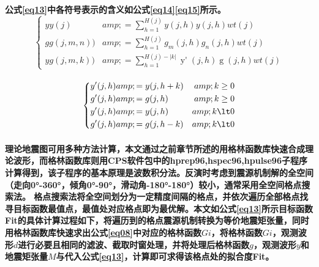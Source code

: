\documentclass[a4paper,12pt,single,pdftex]{scrartcl}
\begin{document}
\label{ID_247138940}\paragraph{公式\ref{eq13}中各符号表示的含义如公式\ref{eq14}\ref{eq15}所示。
\begin{equation}
\label{eq14}
\left\{
    \begin{aligned}
    yy(j)&amp;=\sum_{h=1}^{H(j)}y(j,h)y(j,h)wt(j)\\
    gg(j,m,n))&amp;=\sum_{h=1}^{H(j)}g_{m}(j,h)g_{n}(j,h)wt(j)\\
    yg(j,m,k))&amp;=\sum_{h=1}^{H(j)-|k|}\mathop{{y}'}(j,h)\mathop{{g}'_{m}}(j,h)wt(j)
    \end{aligned}
\right.
\end{equation}}

\label{ID_457268259}\paragraph{\begin{equation}
\label{eq15}
\left\{
    \begin{aligned}
    \mathop{{y}'}(j,h)&amp;=y(j,h+k) &amp;k\geq0 \\
    \mathop{{g}'}(j,h)&amp;=g(j,h)   &amp;k\geq0 \\
    \mathop{{y}'}(j,h)&amp;=y(j,h)   &amp;k\lt0 \\
    \mathop{{g}'}(j,h)&amp;=g(j,h-k) &amp;k\lt0 \\
    \end{aligned}   \\
\right.
\end{equation}}

\label{ID_31082694}\paragraph{}

\label{ID_1372162761}\paragraph{理论地震图可用多种方法计算，本文通过之前章节所述的用格林函数库快速合成理论波形，而格林函数库则用CPS软件包中的hprep96,hspec96,hpulse96子程序计算得到，该子程序的基本原理是波数积分法。反演时考虑到震源机制解的全空间（走向0°-360°，倾角0°-90°，滑动角-180°-180°）较小，通常采用全空间格点搜索法。
格点搜索法将全空间划分为一定精度间隔的格点，并依次遍历全部格点找寻目标函数最值点，最值处对应格点即为最优解。本文如公式\ref{eq13}所示目标函数Fit的具体计算过程如下，将遍历到的格点震源机制转换为等价地震矩张量\citep{Jost1989}，同时用格林函数库快速求出公式\ref{eq08}中对应的格林函数$Gi$，将格林函数$Gi$，观测波形$d$进行必要且相同的滤波、截取时窗处理，并将处理后格林函数$g$，观测波形$y$和地震矩张量$M$与代入公式\ref{eq13}，计算即可求得该格点处的拟合度Fit。}
\end{document}
